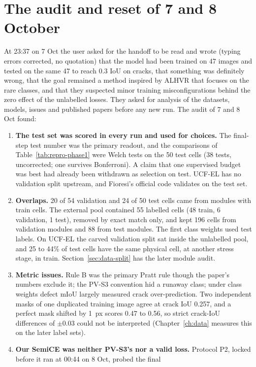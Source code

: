 \section{The audit and reset of 7 and 8 October}\label{sec:repro-audit}

At 23:37 on 7 Oct the user asked for the handoff to be read and wrote (typing errors corrected, no quotation) that the model had been
trained on 47 images and tested on the same 47 to reach 0.3 IoU on cracks, that something was definitely wrong, that the goal remained
a method inspired by ALHVR that focuses on the rare classes, and that they suspected minor training misconfigurations behind the zero
effect of the unlabelled losses. They asked for
analysis of the datasets, models, issues and published papers before any new run. The audit of 7 and 8 Oct found:
\begin{enumerate}
  \item \textbf{The test set was scored in every run and used for choices.} The final-step test number was the primary readout, and
    the comparisons of Table~\ref{tab:repro-phase1} were Welch tests on the 50 test cells (38 tests, uncorrected; one survives
    Bonferroni). A claim that one supervised budget was best had already been withdrawn as selection on test. UCF-EL has no
    validation split upstream, and Fioresi's official code validates on the test set.
  \item \textbf{Overlaps.} 20 of 54 validation and 24 of 50 test cells came from modules with train cells. The external pool contained
    55 labelled cells (48 train, 6 validation, 1 test), removed by exact match only, and kept 196 cells from validation modules and 88
    from test modules. The first class weights used test labels. On UCF-EL the carved validation split sat inside the unlabelled pool,
    and 25 to 44\% of test cells have the same physical cell, at another stress stage, in train. Section~\ref{sec:data-split} has the
    later module audit.
  \item \textbf{Metric issues.} Rule B was the primary Pratt rule though the paper's numbers exclude it; the PV-S3 convention hid a
    runaway class; under class weights defect mIoU largely measured crack over-prediction. Two independent masks of one duplicated
    training image agree at crack IoU 0.257, and a perfect mask shifted by 1~px scores 0.47 to 0.56, so strict crack-IoU differences
    of $\pm 0.03$ could not be interpreted (Chapter~\ref{ch:data} measures this on the later label sets).
  \item \textbf{Our SemiCE was neither PV-S3's nor a valid loss.} Protocol P2, locked before it ran at 00:44 on 8 Oct, probed the final

\end{enumerate}
